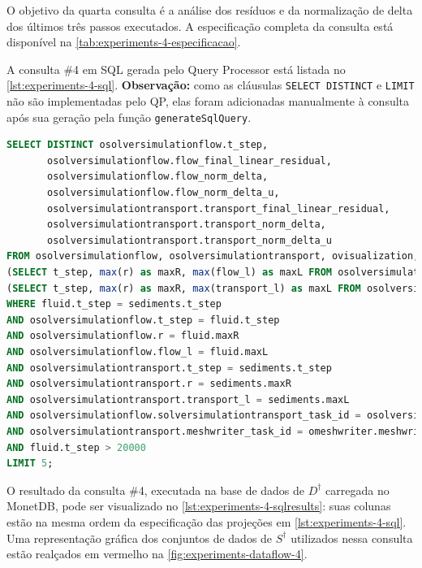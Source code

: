 O objetivo da quarta consulta é a análise dos resíduos e da normalização de delta dos últimos três passos executados. A especificação completa da consulta está disponível na \autoref{tab:experiments-4-especificacao}.

A consulta \#4 em SQL gerada pelo Query Processor está listada no \autoref{lst:experiments-4-sql}. \textbf{Observação:} como as cláusulas \texttt{SELECT DISTINCT} e \texttt{LIMIT} não são implementadas pelo QP, elas foram adicionadas manualmente à consulta após sua geração pela função \texttt{generateSqlQuery}.

\begin{minipage}[c]{0.95\textwidth}
\begin{lstlisting}[language=sql,label={lst:experiments-4-sql},caption={[Código em SQL gerado na consulta~\#4]Código em SQL gerado na consulta~\#4 (tempo médio: TODO~ms).}]
SELECT DISTINCT osolversimulationflow.t_step,
       osolversimulationflow.flow_final_linear_residual,
       osolversimulationflow.flow_norm_delta,
       osolversimulationflow.flow_norm_delta_u,
       osolversimulationtransport.transport_final_linear_residual,
       osolversimulationtransport.transport_norm_delta,
       osolversimulationtransport.transport_norm_delta_u
FROM osolversimulationflow, osolversimulationtransport, ovisualization, omeshwriter,
(SELECT t_step, max(r) as maxR, max(flow_l) as maxL FROM osolversimulationflow GROUP BY t_step) as fluid,
(SELECT t_step, max(r) as maxR, max(transport_l) as maxL FROM osolversimulationtransport GROUP BY t_step) as sediments
WHERE fluid.t_step = sediments.t_step
AND osolversimulationflow.t_step = fluid.t_step
AND osolversimulationflow.r = fluid.maxR
AND osolversimulationflow.flow_l = fluid.maxL
AND osolversimulationtransport.t_step = sediments.t_step
AND osolversimulationtransport.r = sediments.maxR
AND osolversimulationtransport.transport_l = sediments.maxL
AND osolversimulationflow.solversimulationtransport_task_id = osolversimulationtransport.solversimulationtransport_task_id
AND osolversimulationtransport.meshwriter_task_id = omeshwriter.meshwriter_task_id
AND fluid.t_step > 20000
LIMIT 5;
\end{lstlisting}
\end{minipage}

O resultado da consulta \#4, executada na base de dados de \(D^{\dagger}\) carregada no MonetDB, pode ser visualizado no \autoref{lst:experiments-4-sqlresults}: suas colunas estão na mesma ordem da especificação das projeções em \autoref{lst:experiments-4-sql}. Uma representação gráfica dos conjuntos de dados de \(S^{\dagger}\) utilizados nessa consulta estão realçados em vermelho na \autoref{fig:experiments-dataflow-4}.

